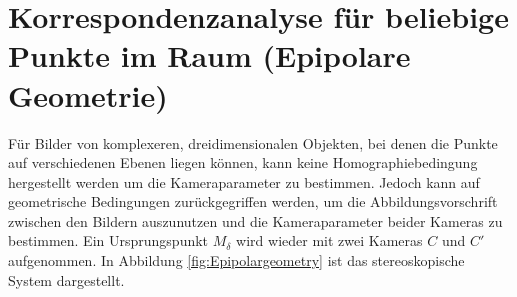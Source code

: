 % 
% 
% 
% 


\section{Korrespondenzanalyse für beliebige Punkte im Raum (Epipolare Geometrie)}
\label{sec:EpiolarContraints}

Für Bilder von komplexeren, dreidimensionalen Objekten, bei denen die Punkte auf verschiedenen Ebenen liegen können, kann keine Homographiebedingung hergestellt werden um die Kameraparameter zu bestimmen. Jedoch kann auf geometrische Bedingungen zurückgegriffen werden, um die Abbildungsvorschrift zwischen den Bildern auszunutzen und die Kameraparameter beider Kameras zu bestimmen. Ein Ursprungspunkt $M_\delta$ wird wieder mit zwei Kameras $C$ und $C'$ aufgenommen. In Abbildung \ref{fig:Epipolargeometry} ist das stereoskopische System dargestellt.
\pagebreak



